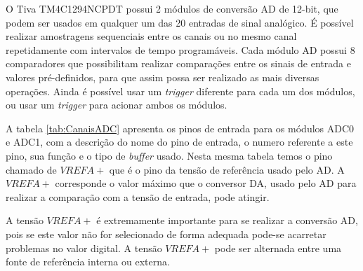 O Tiva TM4C1294NCPDT possui 2 módulos de conversão AD  de 12-bit, que podem ser usados em qualquer um das 20 entradas de sinal analógico. É possível realizar amostragens sequenciais entre os canais ou no mesmo canal repetidamente com intervalos de tempo  programáveis. Cada módulo AD possui 8 comparadores que possibilitam realizar comparações entre os sinais de entrada e  valores pré-definidos, para que assim possa ser realizado as mais diversas operações.  Ainda é possível usar um \emph{trigger} diferente para cada um dos módulos, ou usar um \emph{trigger} para acionar ambos os módulos.

A tabela \ref{tab:CanaisADC} apresenta os pinos de entrada para os módulos ADC0 e ADC1, com a descrição do nome do pino de entrada, o numero referente a este pino, sua função e o tipo de \emph{buffer} usado. Nesta mesma tabela temos o  pino chamado de $VREFA+$ que é o pino da tensão de referência usado pelo AD. A $VREFA+$ corresponde o valor máximo que o conversor DA, usado pelo AD para realizar a comparação com a tensão de entrada, pode atingir. 

A tensão $VREFA+$ é extremamente importante para se realizar a conversão AD, pois se este valor não for selecionado de forma adequada pode-se acarretar problemas no valor digital. A tensão $VREFA+$ pode ser alternada entre uma fonte de referência interna ou externa. 

